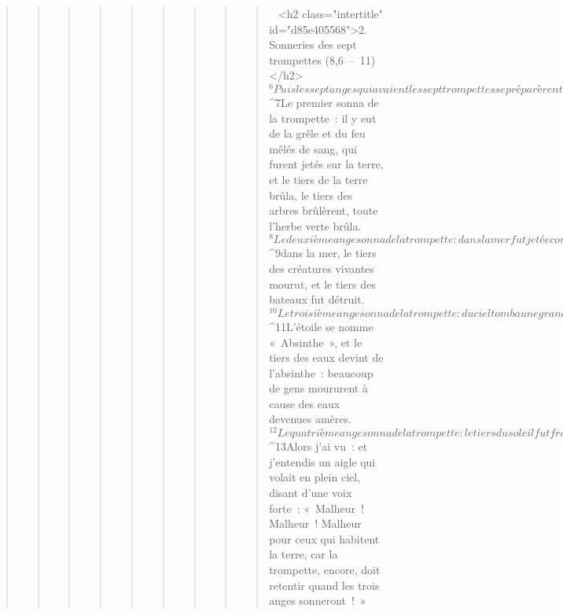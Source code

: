 \begin{verse}
\begin{verse}
\begin{verse}
\begin{verse}
\begin{verse}
\begin{verse}
\begin{verse}
\begin{verse}
\begin{verse}
         
      <h2 class="intertitle" id="d85e405568">2. Sonneries des sept trompettes (8,6 – 11)</h2>
${}^{6}Puis les sept anges qui avaient les sept trompettes se préparèrent à en sonner.
${}^{7}Le premier sonna de la trompette : il y eut de la grêle et du feu mêlés de sang, qui furent jetés sur la terre, et le tiers de la terre brûla, le tiers des arbres brûlèrent, toute l’herbe verte brûla.
${}^{8}Le deuxième ange sonna de la trompette : dans la mer fut jetée comme une grande montagne embrasée, et le tiers de la mer fut changé en sang ; 
${}^{9}dans la mer, le tiers des créatures vivantes mourut, et le tiers des bateaux fut détruit.
${}^{10}Le troisième ange sonna de la trompette : du ciel tomba une grande étoile qui flambait comme une torche ; elle tomba sur le tiers des fleuves et sur les sources des eaux. 
${}^{11}L’étoile se nomme « Absinthe », et le tiers des eaux devint de l’absinthe : beaucoup de gens moururent à cause des eaux devenues amères.
${}^{12}Le quatrième ange sonna de la trompette : le tiers du soleil fut frappé, et le tiers de la lune et le tiers des étoiles ; ainsi chacun d’entre eux fut obscurci d’un tiers, le jour perdit le tiers de sa clarté et, de même, la nuit.
${}^{13}Alors j’ai vu : et j’entendis un aigle qui volait en plein ciel, disant d’une voix forte : « Malheur ! Malheur ! Malheur pour ceux qui habitent la terre, car la trompette, encore, doit retentir quand les trois anges sonneront ! »
      

\end{verse}
\end{verse}
\end{verse}
\end{verse}
\end{verse}
\end{verse}
\end{verse}
\end{verse}
\end{verse}
